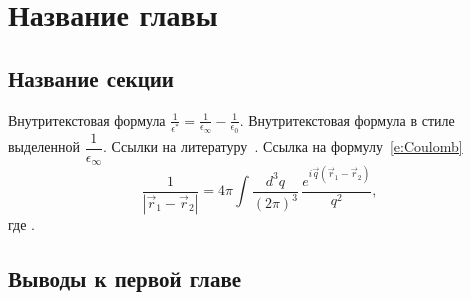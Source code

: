 \chapter{Название главы}
\section{Название секции}

Внутритекстовая формула $\frac{1}{\epsilon^*}=\frac{1}{\epsilon_\infty}-\frac{1}{\epsilon_0}$.
Внутритекстовая формула в стиле выделенной $\dfrac{1}{\epsilon_\infty}$.
Ссылки на литературу~\cite{Yoffe_1993_AP_42_173,Efros_1982_FTP_16_7_1209,%
Anselm_1978,Segall_1968,Agranovich_1983,InP,Mishchenko_1996,Skvortsov_2008,%
Perelman_2003_math:0307245,Nielsen_2010_1006.2735,patent1,patent2}.
Ссылка на формулу~\eqref{e:Coulomb}
\begin{equation}\label{e:Coulomb}
  \frac{1}{|\vec r_1 - \vec r_2|} =
  4\pi \int \frac{d^3 q}{(2\pi)^3}\,
  \frac{e^{i\vec q(\vec r_1 - \vec r_2)}}{q^2},
\end{equation}
где .

\section{Выводы к первой главе}
